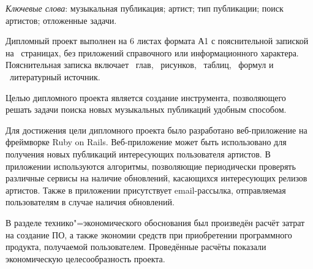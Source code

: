 \thispagestyle{empty}

\emph{Ключевые слова}: музыкальная публикация; артист; тип публикации; поиск артистов; отложенные задачи.

\vspace{4\parsep}

Дипломный проект выполнен на 6 листах формата А1 с пояснительной запиской на~\pageref*{LastPage} страницах, без приложений справочного или информационного характера.
Пояснительная записка включает ~глав, \totfig{}~рисунков, \tottab{}~таблиц, \toteq{}~формул и \totref{}~литературный источник.

Целью дипломного проекта является создание инструмента, позволяющего решать задачи поиска новых музыкальных публикаций удобным способом.

Для достижения цели дипломного проекта было разработано веб-приложение на фреймворке Ruby on Rails.
Веб-приложение может быть использовано для получения новых публикаций интересующих пользователя артистов.
В приложении используются алгоритмы, позволяющие периодически проверять различные сервисы на наличие обновлений, касающихся интересующих релизов артистов. Также в приложении присутствует email-рассылка, отправляемая пользователям в случае наличия обновлений.

В разделе технико"=экономического обоснования был произведён расчёт затрат на создание ПО, а также экономии средств при приобретении программного продукта, получаемой пользователем.
Проведённые расчёты показали экономическую целесообразность проекта.

\clearpage
